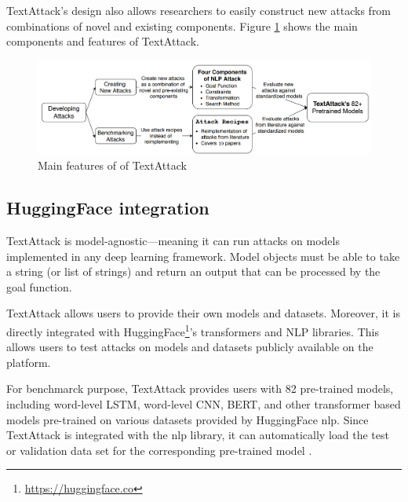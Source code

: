 TextAttack's design also allows researchers to easily construct new attacks from combinations of novel and existing components.
Figure \ref{fig:2_4_textattack} shows the main components and features of TextAttack.

\begin{figure}[h]
    \centering
    \includegraphics[width=0.9\linewidth]{images/2_4_textattack.png}
    \caption{Main features of of TextAttack}
    \label{fig:2_4_textattack}
\end{figure}

\subsection{HuggingFace integration}\label{subsec:huggingface-integration}

TextAttack is model-agnostic---meaning it
can run attacks on models implemented in any deep learning framework. Model objects must be able to take a string (or list of strings) and return an output that can be processed by the goal function.

TextAttack allows users to provide their own models and datasets. Moreover, it is directly integrated with HuggingFace\footnote{\url{https://huggingface.co}}'s transformers and NLP libraries. This allows users to test attacks on models and datasets publicly available on the platform. 

For benchmarck purpose, TextAttack
provides users with 82 pre-trained models, including word-level LSTM, word-level CNN, BERT, and other transformer based models pre-trained on various datasets provided by HuggingFace nlp. Since TextAttack is integrated with the nlp library, it can automatically load the test or validation data set for the corresponding pre-trained model \cite{journals/corr/abs-2005-05909}. 

